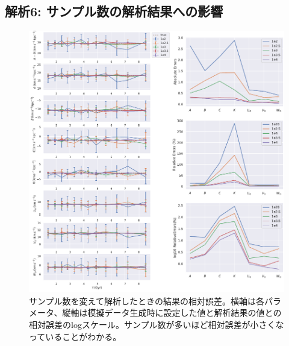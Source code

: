 \subsection{解析6: サンプル数の解析結果への影響}
\begin{figure}[htbp]
	\centering
	\includegraphics[width=15cm]{fig/Mock_N.pdf}
	\caption{サンプル数を変えて解析したときの結果の相対誤差。横軸は各パラメータ、縦軸は模擬データ生成時に設定した値と解析結果の値との相対誤差のlogスケール。サンプル数が多いほど相対誤差が小さくなっていることがわかる。} \label{fig:Mock_N}
\end{figure}


